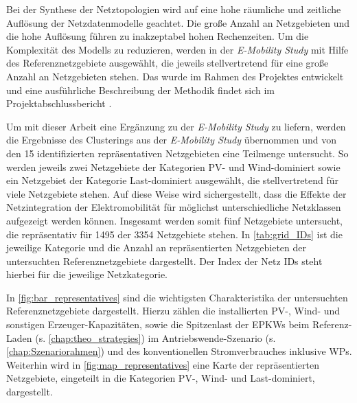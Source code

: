 

Bei der Synthese der Netztopologien wird auf eine hohe räumliche und zeitliche Auflösung der Netzdatenmodelle geachtet.
Die große Anzahl an Netzgebieten und die hohe Auflösung führen zu inakzeptabel hohen Rechenzeiten.
Um die Komplexität des Modells zu reduzieren, werden in der \textit{E-Mobility Study} \cite{Schachler} mit Hilfe des \mbox{\kmeans} Referenznetzgebiete ausgewählt, die jeweils stellvertretend für eine große Anzahl an Netzgebieten stehen.
Das \mbox{\kmean} wurde im Rahmen des  Projektes entwickelt und eine ausführliche Beschreibung der Methodik findet sich im Projektabschlussbericht \cite{Mueller2019}.

Um mit dieser Arbeit eine Ergänzung zu der \textit{E-Mobility Study} zu liefern, werden die Ergebnisse des Clusterings aus der \textit{E-Mobility Study} übernommen und von den \num{15} identifizierten repräsentativen Netzgebieten eine Teilmenge untersucht.
So werden jeweils zwei Netzgebiete der Kategorien \gls{PV}- und Wind-dominiert sowie ein Netzgebiet der Kategorie Last-dominiert ausgewählt, die stellvertretend für viele Netzgebiete stehen.
Auf diese Weise wird sichergestellt, dass die Effekte der Netzintegration der Elektromobilität für möglichst unterschiedliche Netzklassen aufgezeigt werden können.
Insgesamt werden somit fünf Netzgebiete untersucht, die repräsentativ für \num{1495} der \num{3354} Netzgebiete stehen.
In \autoref{tab:grid_IDs} ist die jeweilige Kategorie und die Anzahl an repräsentierten Netzgebieten der untersuchten Referenznetzgebiete dargestellt.
Der Index der Netz \glspl{ID} steht hierbei für die jeweilige Netzkategorie.



In \autoref{fig:bar_representatives} sind die wichtigsten Charakteristika der untersuchten Referenznetzgebiete dargestellt.
Hierzu zählen die installierten \gls{PV}-, Wind- und sonstigen Erzeuger-Kapazitäten, sowie die Spitzenlast der \glspl{EPKW} beim Referenz-Laden (s. \autoref{chap:theo_strategies}) im Antriebswende-Szenario (s. \autoref{chap:Szenariorahmen}) und des konventionellen Stromverbrauches inklusive \glspl{WP}.
Weiterhin wird in \autoref{fig:map_representatives} eine Karte der repräsentierten Netzgebiete, eingeteilt in die Kategorien \gls{PV}-, Wind- und Last-dominiert, dargestellt.






